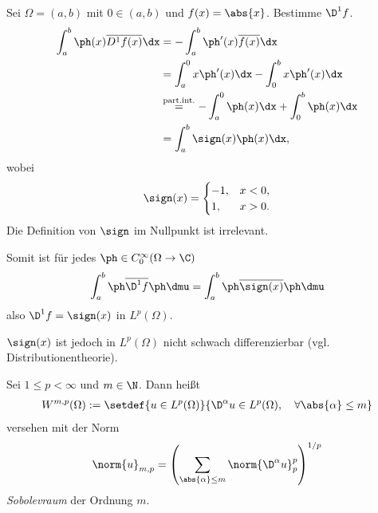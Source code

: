 \begin{bsp}
\label{bsp:7.27}
Sei $\Omega=(a,b)$ mit $0\in (a,b)$ und $f(x) = \abs{x}$. Bestimme $\D^1 f$.
\begin{align*}
\int_a^b \ph(x) \overline{D^1 f(x)}\dx
&= - \int_a^b \ph'(x)\overline{f(x)}\dx \\ &= 
\int_a^0 x\ph'(x)\dx - \int_0^b x\ph'(x)\dx\\
&\overset{\text{part.int.}}{=}
-\int_a^0 \ph(x)\dx + \int_0^b \ph(x)\dx\\
&= \int_a^b \sign(x)\ph(x)\dx,
\end{align*}
wobei
\begin{align*}
\sign(x) = 
\begin{cases}
-1, & x < 0,\\
1, &  x > 0.
\end{cases}
\end{align*}
Die Definition von $\sign$ im Nullpunkt ist irrelevant.

Somit ist für jedes $\ph\in C_0^\infty(\Omega\to \C)$
\begin{align*}
\int_a^b \ph \overline{\D^1 f}\ph\dmu = 
\int_a^b \ph \overline{\sign(x)}\ph\dmu 
\end{align*}
also $\D^1 f = \sign(x)$ in $L^p(\Omega)$.

$\sign(x)$ ist jedoch in $L^p(\Omega)$ nicht schwach differenzierbar (vgl.
Distributionentheorie).\bsphere
\end{bsp}


\begin{defn}
\label{defn:7.28}
Sei $1\le p < \infty$ und $m\in\N$. Dann heißt
\begin{align*}
W^{m,p}(\Omega) := \setdef{u\in L^p(\Omega)}{\D^\alpha u \in L^p(\Omega),\quad
\forall \abs{\alpha}\le m}
\end{align*}
versehen mit der Norm
\begin{align*}
\norm{u}_{m,p} = \left(\sum_{\abs{\alpha}\le m} \norm{\D^\alpha
u}_p^p\right)^{1/p}
\end{align*}
\emph{Sobolevraum} der Ordnung $m$.\fishhere
\end{defn}

